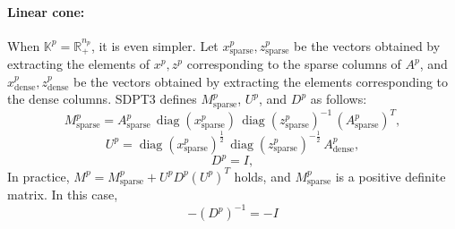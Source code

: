 \paragraph{Linear cone:}

When $\mathbb{K}^p = \mathbb{R}^{n_p}_+$, it is even simpler.
Let $x^p_{\mathrm{sparse}}, z^p_{\mathrm{sparse}}$ be the vectors obtained by extracting the elements of $x^p, z^p$ corresponding to the sparse columns of $A^p$, and $x^p_{\mathrm{dense}}, z^p_{\mathrm{dense}}$ be the vectors obtained by extracting the elements corresponding to the dense columns.
SDPT3 defines $M^p_{\mathrm{sparse}}$, $U^p$, and $D^p$ as follows:
\[
   M^p_{\mathrm{sparse}}
   = A^p_{\mathrm{sparse}}
     \,\operatorname{diag}(x^p_{\mathrm{sparse}})
     \,\operatorname{diag}(z^p_{\mathrm{sparse}})^{-1}
     \,(A^p_{\mathrm{sparse}})^T,
\]
\[
   U^p
   = \operatorname{diag}(x^p_{\mathrm{sparse}})^{\tfrac12}
     \,\operatorname{diag}(z^p_{\mathrm{sparse}})^{-\tfrac12}
     \,A^p_{\mathrm{dense}},
\]
\[ D^p = I, \]
In practice, $M^p = M^p_{\mathrm{sparse}} + U^p D^p (U^p)^T$ holds, and $M^p_{\mathrm{sparse}}$ is a positive definite matrix.
In this case,
\[-(D^p)^{-1} = -I\]

\medskip